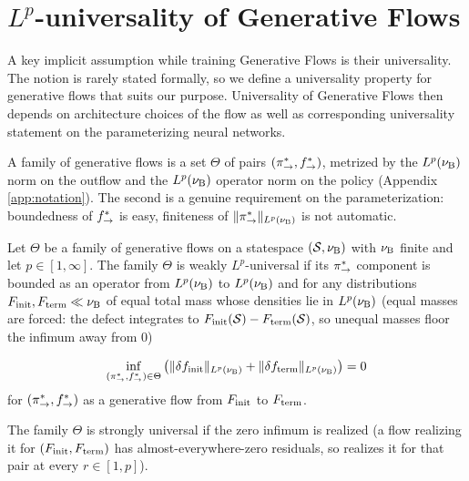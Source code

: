 \section{$L^p$-universality of Generative Flows}\label{sec:universality}
A key implicit assumption while training Generative Flows is their universality. The notion is rarely stated formally, so we define a universality property for generative flows that suits our purpose. Universality of Generative Flows then depends on architecture choices of the flow as well as corresponding universality statement on the parameterizing neural networks.

A family of generative flows is a set $\Theta$ of pairs $(\pi_{\rightarrow}^*,f^*_{\rightarrow})$,
metrized by the $L^p(\nu_{\mathrm{B}})$ norm on the outflow and the $L^p(\nu_{\mathrm{B}})$ operator norm on the
policy (Appendix \ref{app:notation}). The second is a genuine requirement on the
parameterization: boundedness of $f^*_{\rightarrow}$ is easy, finiteness of
$\|\pi_{\rightarrow}^*\|_{L^p(\nu_{\mathrm{B}})}$ is not automatic.

\begin{definition}\label{def:universality} Let $\Theta$ be a family of generative flows on a statespace $(\mathcal S,\nu_{\mathrm{B}})$ with $\nu_{\mathrm{B}}$ finite and let $p\in [1,\infty]$. The family $\Theta$ is weakly $L^p$-universal if its $\pi_{\rightarrow}^*$ component is bounded as an operator from $L^p(\nu_{\mathrm{B}})$ to $L^p(\nu_{\mathrm{B}})$  and for any distributions $F_{\mathrm{init}},F_{\mathrm{term}} \ll \nu_{\mathrm{B}}$ of equal total mass whose densities lie in $L^p(\nu_{\mathrm{B}})$ (equal masses are forced: the defect integrates to $F_{\mathrm{init}}(\mathcal S)-F_{\mathrm{term}}(\mathcal S)$, so unequal masses floor the infimum away from $0$)

\begin{equation}
    \inf_{(\pi_{\rightarrow}^*, f^*_{\rightarrow}) \in \Theta }\left(\|\delta f_{\mathrm{init}}\|_{L^p(\nu_{\mathrm{B}})} + \|\delta f_{\mathrm{term}}\|_{L^p(\nu_{\mathrm{B}})} \right)=0
\end{equation}
for $(\pi_{\rightarrow}^*, f^*_{\rightarrow})$ as a generative flow from $F_{\mathrm{init}}$ to $F_{\mathrm{term}}$.

The family $\Theta$ is strongly universal if the zero infimum is realized (a flow realizing it for $(F_{\mathrm{init}},F_{\mathrm{term}})$ has almost-everywhere-zero residuals, so realizes it for that pair at every $r\in[1,p]$).

\end{definition}



